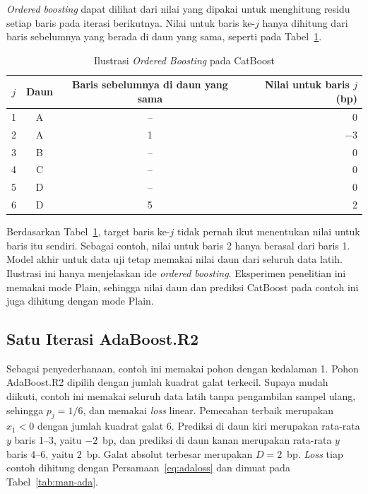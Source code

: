 \textit{Ordered boosting} dapat dilihat dari nilai yang dipakai untuk menghitung
residu setiap baris pada iterasi berikutnya. Nilai untuk baris ke-$j$ hanya
dihitung dari baris sebelumnya yang berada di daun yang sama, seperti pada
Tabel~\ref{tab:man-ordered}.

\begin{table}[htbp]
  \caption{Ilustrasi \textit{Ordered Boosting} pada CatBoost}
  \label{tab:man-ordered}
  \centering
  \begingroup
  \footnotesize
  \setlength{\tabcolsep}{6pt}
  \begin{tabular}{|c|c|c|r|}
    \hline
    \textbf{$j$} & \textbf{Daun} & \textbf{Baris sebelumnya di daun yang sama} & \textbf{Nilai untuk baris $j$ (bp)} \\
    \hline
    1 & A & -- & $0$ \\
    2 & A & 1 & $-3$ \\
    3 & B & -- & $0$ \\
    4 & C & -- & $0$ \\
    5 & D & -- & $0$ \\
    6 & D & 5 & $2$ \\
    \hline
  \end{tabular}
  \endgroup
\end{table}

Berdasarkan Tabel~\ref{tab:man-ordered}, target baris ke-$j$ tidak pernah ikut
menentukan nilai untuk baris itu sendiri. Sebagai contoh, nilai untuk baris 2
hanya berasal dari baris 1. Model akhir untuk data uji tetap memakai nilai
daun dari seluruh data latih. Ilustrasi ini hanya menjelaskan ide
\textit{ordered boosting}. Eksperimen penelitian ini memakai mode Plain,
sehingga nilai daun dan prediksi CatBoost pada contoh ini juga dihitung dengan
mode Plain.

\subsection{Satu Iterasi AdaBoost.R2}
Sebagai penyederhanaan, contoh ini memakai pohon dengan kedalaman 1. Pohon
AdaBoost.R2 dipilih dengan jumlah kuadrat galat terkecil. Supaya mudah
diikuti, contoh ini memakai seluruh data latih tanpa pengambilan sampel ulang,
sehingga $p_j = 1/6$, dan memakai \textit{loss} linear. Pemecahan terbaik
merupakan $x_1 < 0$ dengan jumlah kuadrat galat 6. Prediksi di daun kiri
merupakan rata-rata $y$ baris 1--3, yaitu $-2$~bp, dan prediksi di daun
kanan merupakan rata-rata $y$ baris 4--6, yaitu $2$~bp. Galat absolut
terbesar merupakan $D = 2$~bp. \textit{Loss} tiap contoh dihitung dengan
Persamaan~\eqref{eq:adaloss} dan dimuat pada Tabel~\ref{tab:man-ada}.

